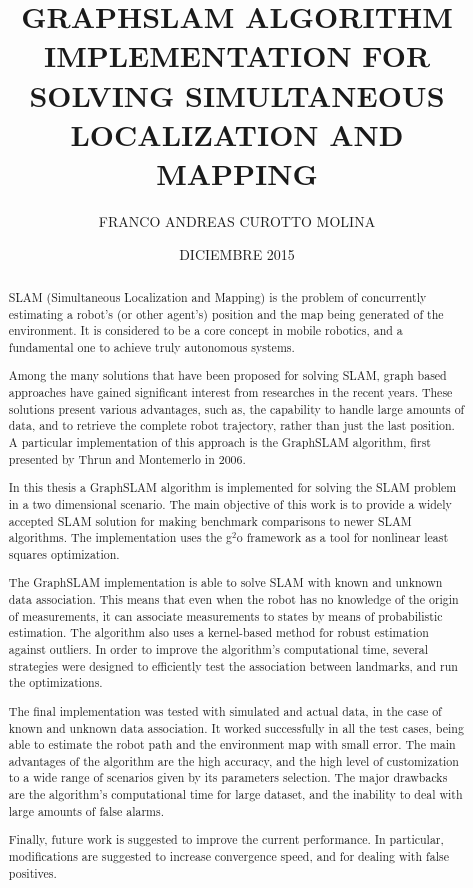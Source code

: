 \documentclass[upright, contnum]{umemoria}
\author{FRANCO ANDREAS CUROTTO MOLINA}
\title{GRAPHSLAM ALGORITHM IMPLEMENTATION FOR SOLVING SIMULTANEOUS LOCALIZATION AND MAPPING}
\date{DICIEMBRE 2015}
\begin{document}
\frontmatter
\maketitle

\begin{abstract}
SLAM (Simultaneous Localization and Mapping) is the problem of concurrently estimating a robot's (or other agent's) position and the map being generated of the environment. It is considered to be a core concept in mobile robotics, and a fundamental one to achieve truly autonomous systems. 

Among the many solutions that have been proposed for solving SLAM, graph based approaches have gained significant interest from researches in the recent years. These solutions present various advantages, such as, the capability to handle large amounts of data, and to retrieve the complete robot trajectory, rather than just the last position. A particular implementation of this approach is the GraphSLAM algorithm, first presented by Thrun and Montemerlo in 2006.

In this thesis a GraphSLAM algorithm is implemented for solving the SLAM problem in a two dimensional scenario. The main objective of this work is to provide a widely accepted SLAM solution for making benchmark comparisons to newer SLAM algorithms. The implementation uses the g$^2$o framework as a tool for nonlinear least squares optimization.

The GraphSLAM implementation is able to solve SLAM with known and unknown data association. This means that even when the robot has no knowledge of the origin of measurements, it can associate measurements to states by means of probabilistic estimation. The algorithm also uses a kernel-based method for robust estimation against outliers. In order to improve the algorithm's computational time, several strategies were designed to efficiently test the association between landmarks, and run the optimizations. 

The final implementation was tested with simulated and actual data, in the case of known and unknown data association. It worked successfully in all the test cases, being able to estimate the robot path and the environment map with small error. The main advantages of the algorithm are the high accuracy, and the 
high level of customization to a wide range of scenarios given by its parameters selection. The major drawbacks are the algorithm's computational time for large dataset, and the inability to deal with large amounts of false alarms. 

Finally, future work is suggested to improve the current performance. In particular, modifications are suggested to increase convergence speed, and for dealing with false positives.   
\end{abstract}
\end{document}

